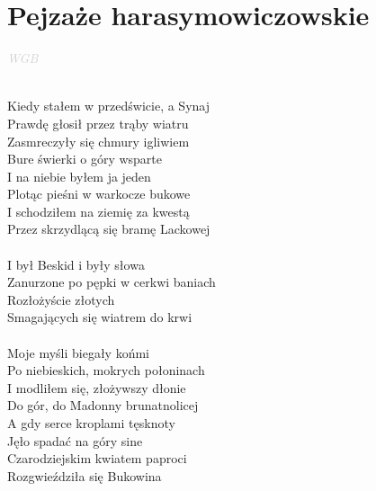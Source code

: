 \documentclass[a5paper, 10pt]{book}
\begin{document}
\newpage
\section{Pejzaże harasymowiczowskie}\textcolor{lightgray}{\textit{WGB}}\\~\\
\begin{minipage}[t]{0.8\textwidth}
Kiedy stałem w przedświcie, a Synaj\\
Prawdę głosił przez trąby wiatru\\
Zasmreczyły się chmury igliwiem\\
Bure świerki o góry wsparte\\
I na niebie byłem ja jeden\\
Plotąc pieśni w warkocze bukowe\\
I schodziłem na ziemię za kwestą\\
Przez skrzydlącą się bramę Lackowej\\
\\
\hspace*{5mm}I był Beskid i były słowa\\
\hspace*{5mm}Zanurzone po pępki w cerkwi baniach\\
\hspace*{5mm}Rozłożyście złotych\\
\hspace*{5mm}Smagających się wiatrem do krwi\\
\\
Moje myśli biegały końmi\\
Po niebieskich, mokrych połoninach\\
I modliłem się, złożywszy dłonie\\
Do gór, do Madonny brunatnolicej\\
A gdy serce kroplami tęsknoty\\
Jęło spadać na góry sine\\
Czarodziejskim kwiatem paproci\\
Rozgwieździła się Bukowina\\
\end{minipage}
\end{document}
